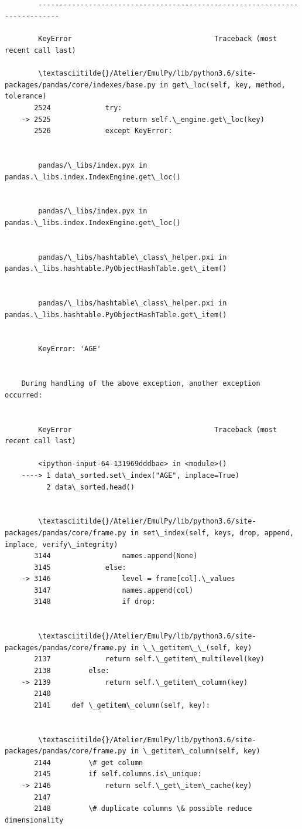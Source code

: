 \documentclass[11pt]{article}
\begin{document}
    \begin{Verbatim}[commandchars=\\\{\}]

        ---------------------------------------------------------------------------

        KeyError                                  Traceback (most recent call last)

        \textasciitilde{}/Atelier/EmulPy/lib/python3.6/site-packages/pandas/core/indexes/base.py in get\_loc(self, key, method, tolerance)
       2524             try:
    -> 2525                 return self.\_engine.get\_loc(key)
       2526             except KeyError:


        pandas/\_libs/index.pyx in pandas.\_libs.index.IndexEngine.get\_loc()


        pandas/\_libs/index.pyx in pandas.\_libs.index.IndexEngine.get\_loc()


        pandas/\_libs/hashtable\_class\_helper.pxi in pandas.\_libs.hashtable.PyObjectHashTable.get\_item()


        pandas/\_libs/hashtable\_class\_helper.pxi in pandas.\_libs.hashtable.PyObjectHashTable.get\_item()


        KeyError: 'AGE'

        
    During handling of the above exception, another exception occurred:


        KeyError                                  Traceback (most recent call last)

        <ipython-input-64-131969dddbae> in <module>()
    ----> 1 data\_sorted.set\_index("AGE", inplace=True)
          2 data\_sorted.head()


        \textasciitilde{}/Atelier/EmulPy/lib/python3.6/site-packages/pandas/core/frame.py in set\_index(self, keys, drop, append, inplace, verify\_integrity)
       3144                 names.append(None)
       3145             else:
    -> 3146                 level = frame[col].\_values
       3147                 names.append(col)
       3148                 if drop:


        \textasciitilde{}/Atelier/EmulPy/lib/python3.6/site-packages/pandas/core/frame.py in \_\_getitem\_\_(self, key)
       2137             return self.\_getitem\_multilevel(key)
       2138         else:
    -> 2139             return self.\_getitem\_column(key)
       2140 
       2141     def \_getitem\_column(self, key):


        \textasciitilde{}/Atelier/EmulPy/lib/python3.6/site-packages/pandas/core/frame.py in \_getitem\_column(self, key)
       2144         \# get column
       2145         if self.columns.is\_unique:
    -> 2146             return self.\_get\_item\_cache(key)
       2147 
       2148         \# duplicate columns \& possible reduce dimensionality



\end{Verbatim}
\end{document}
